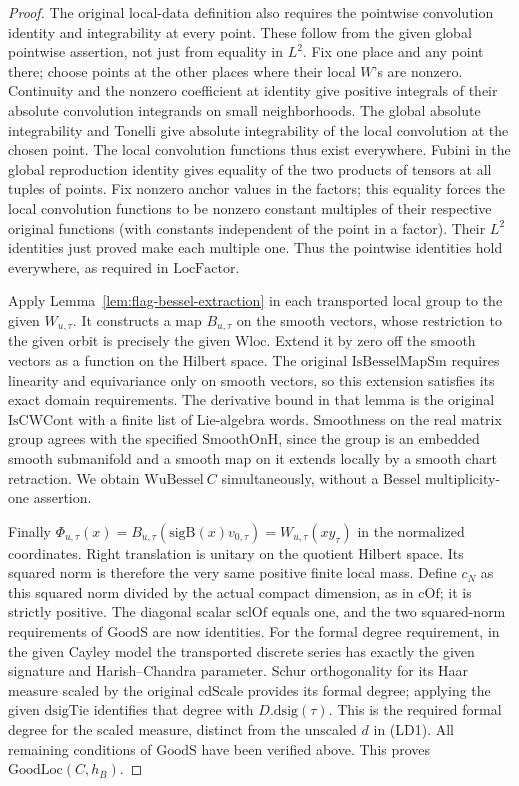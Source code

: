\begin{proof}
The original local-data definition also requires the
pointwise convolution identity and integrability at every
point. These follow from the given global pointwise
assertion, not just from equality in \(L^2\).
Fix one place and any point there; choose points at the
other places where their local \(W\)'s are nonzero.
Continuity and the nonzero coefficient at identity
give positive integrals of their absolute convolution
integrands on small neighborhoods. The global absolute
integrability and Tonelli give absolute integrability
of the local convolution at the chosen point.
The local convolution functions thus exist everywhere.
Fubini in the global reproduction identity gives equality
of the two products of tensors at all tuples of points.
Fix nonzero anchor values in the factors; this equality
forces the local convolution functions to be nonzero
constant multiples of their respective original functions
(with constants independent of the point in a factor).
Their \(L^2\) identities just proved make each multiple
one. Thus the pointwise identities hold everywhere,
as required in \(\mathrm{LocFactor}\).

Apply Lemma~\ref{lem:flag-bessel-extraction} in each
transported local group to the given \(W_{u,\tau}\).
It constructs a map \(B_{u,\tau}\) on the smooth vectors,
whose restriction to the given orbit is precisely the
given \(\mathrm{Wloc}\). Extend it by zero off the smooth
vectors as a function on the Hilbert space. The original
\(\mathrm{IsBesselMapSm}\) requires linearity and
equivariance only on smooth vectors, so this extension
satisfies its exact domain requirements. The derivative
bound in that lemma is the original \(\mathrm{IsCWCont}\)
with a finite list of Lie-algebra words. Smoothness on
the real matrix group agrees with the specified
\(\mathrm{SmoothOnH}\), since the group is an embedded
smooth submanifold and a smooth map on it extends
locally by a smooth chart retraction.
We obtain \(\mathrm{WuBessel}\ C\) simultaneously,
without a Bessel multiplicity-one assertion.

Finally \(\Phi_{u,\tau}(x)=B_{u,\tau}(\mathrm{sigB}(x)
v_{0,\tau})=W_{u,\tau}(x y_\tau)\) in the normalized
coordinates. Right translation is unitary on the
quotient Hilbert space. Its squared norm is therefore
the very same positive finite local mass. Define
\(c_N\) as this squared norm divided by the actual compact
dimension, as in \(\mathrm{cOf}\); it is strictly positive.
The diagonal scalar \(\mathrm{sclOf}\) equals one, and
the two squared-norm requirements of \(\mathrm{GoodS}\)
are now identities. For the formal degree requirement,
in the given Cayley model the transported discrete series
has exactly the given signature and Harish--Chandra
parameter. Schur orthogonality for its Haar measure
scaled by the original \(\mathrm{cdScale}\) provides
its formal degree; applying the given \(\mathrm{dsigTie}\)
identifies that degree with \(D.\mathrm{dsig}(\tau)\).
This is the required formal degree for the scaled
measure, distinct from the unscaled \(d\) in (LD1).
All remaining conditions of \(\mathrm{GoodS}\) have been
verified above. This proves \(\mathrm{GoodLoc}(C,h_B)\).
\end{proof}

